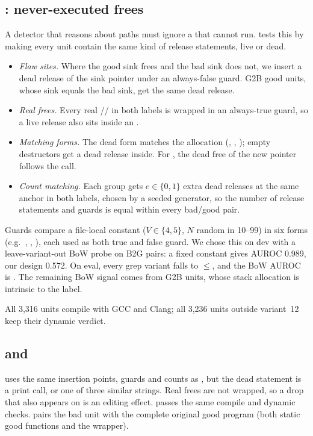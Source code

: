 \subsection{\Dead: never-executed frees}
\label{sec:dead}
A detector that reasons about paths must ignore a  that cannot run.
\Dead{} tests this by making every unit contain the same kind of release statements, live or dead.
\begin{itemize}
\item \emph{Flaw sites.} Where the good sink frees and the bad sink does not, we insert a dead release of the sink pointer under an always-false guard. G2B good units, whose sink equals the bad sink, get the same dead release.
\item \emph{Real frees.} Every real // in both labels is wrapped in an always-true guard, so a live release also sits inside an .
\item \emph{Matching forms.} The dead form matches the allocation (, , ); empty destructors get a dead release inside. For , the dead free of the new pointer follows the call.
\item \emph{Count matching.} Each group gets $e\in\{0,1\}$ extra dead releases at the same anchor in both labels, chosen by a seeded generator, so the number of release statements and guards is equal within every bad/good pair.
\end{itemize}
Guards compare a file-local constant  ($V\in\{4,5\}$, $N$ random in 10--99) in six forms (e.g.\ , , ), each used as both true and false guard. %
We chose this on dev with a leave-variant-out BoW probe on B2G pairs: a fixed constant gives AUROC 0.989, our design 0.572. %
On eval, every grep variant falls to $\le$, and the BoW AUROC is .
The remaining BoW signal comes from G2B units, whose stack allocation is intrinsic to the label. %

All 3,316 \Dead{} units compile with GCC and Clang; all 3,236 units outside variant~12 keep their \Deb{} dynamic verdict. %

\subsection{\Plac{} and \Orig}
\label{sec:plac}
\Plac{} uses the same insertion points, guards and counts as \Dead, but the dead statement is a print call,  or one of three similar strings.
Real frees are not wrapped, so a drop that also appears on \Plac{} is an editing effect.
\Plac{} passes the same compile and dynamic checks. %
\Orig{} pairs the \Deb{} bad unit with the complete original good program (both static good functions and the wrapper).

